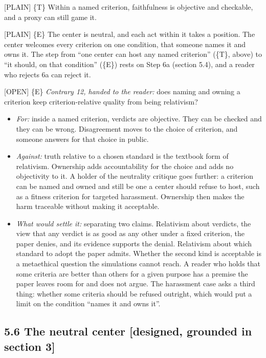 \documentclass[11pt]{article}
\newcommand{\register}[1]{{\ttfamily\small #1}}
\begin{document}
\register{[PLAIN]} \{T\} Within a named criterion, faithfulness is objective and checkable, and a proxy can still game it.

\register{[PLAIN]} \{E\} The center is neutral, and each act within it takes a position. The center welcomes every criterion on one condition, that someone names it and owns it. The step from ``one center can host any named criterion'' (\{T\}, above) to ``it should, on that condition'' (\{E\}) rests on Step 6a (section 5.4), and a reader who rejects 6a can reject it.

\register{[OPEN]} \{E\} \emph{Contrary 12, handed to the reader:} does naming and owning a criterion keep criterion-relative quality from being relativism?

\begin{itemize}
\item \emph{For:} inside a named criterion, verdicts are objective. They can be checked and they can be wrong. Disagreement moves to the choice of criterion, and someone answers for that choice in public.
\item \emph{Against:} truth relative to a chosen standard is the textbook form of relativism. Ownership adds accountability for the choice and adds no objectivity to it. A holder of the neutrality critique goes further: a criterion can be named and owned and still be one a center should refuse to host, such as a fitness criterion for targeted harassment. Ownership then makes the harm traceable without making it acceptable.
\item \emph{What would settle it:} separating two claims. Relativism about verdicts, the view that any verdict is as good as any other under a fixed criterion, the paper denies, and its evidence supports the denial. Relativism about which standard to adopt the paper admits. Whether the second kind is acceptable is a metaethical question the simulations cannot reach. A reader who holds that some criteria are better than others for a given purpose has a premise the paper leaves room for and does not argue. The harassment case asks a third thing: whether some criteria should be refused outright, which would put a limit on the condition ``names it and owns it''.
\end{itemize}
\subsection*{5.6 The neutral center [designed, grounded in section 3]}
\end{document}
